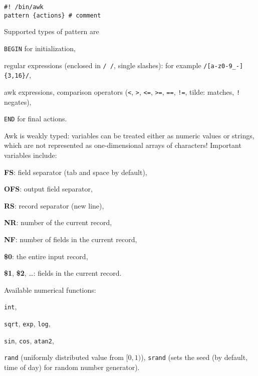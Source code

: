 \begin{verbatim}
#! /bin/awk
pattern {actions} # comment
\end{verbatim}

Supported types of pattern are
\begin{compactenum}
\item \texttt{BEGIN} for initialization,
\item regular expressions (enclosed in \texttt{/ /}, single slashes): for example \texttt{/[a-z0-9\_-]\{3,16\}/},
\item awk expressions, comparison operators (\texttt{<}, \texttt{>}, \texttt{<=}, \texttt{>=}, \texttt{==}, \texttt{!=}, tilde: matches, \texttt{!} negates),
\item \texttt{END} for final actions.
\end{compactenum}

Awk is weakly typed: variables can be treated either as numeric values or strings, which are not represented as one-dimensional arrays of characters!
Important variables include:
\begin{compactenum}
\item \textbf{FS}: field separator (tab and space by default),
\item \textbf{OFS}: output field separator,
\item \textbf{RS}: record separator (new line),
\item \textbf{NR}: number of the current record,
\item \textbf{NF}: number of fields in the current record,
\item \textbf{\$0}: the entire input record,
\item \textbf{\$1}, \textbf{\$2}, \ldots: fields in the current record.
\end{compactenum}

Available numerical functions:
\begin{compactenum}
\item \texttt{int},
\item \texttt{sqrt}, \texttt{exp}, \texttt{log},
\item \texttt{sin}, \texttt{cos}, \texttt{atan2},
\item \texttt{rand} (uniformly distributed value from $[0, 1)$), \texttt{srand} (sets the seed (by default, time of day) for random number generator).
\end{compactenum}


